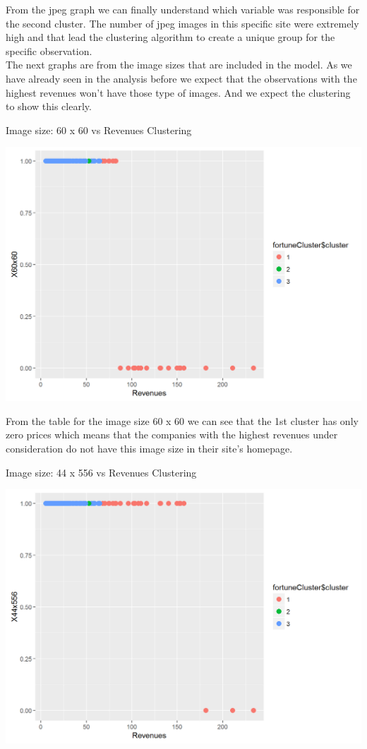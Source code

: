 \documentclass{book}
\begin{document}
From the jpeg graph we can finally understand which variable was responsible for the second cluster. The number of jpeg images in this specific site were extremely high and that lead the clustering algorithm to create a unique group for the specific observation.\\
The next graphs are from the image sizes that are included in the model. As we have already seen in the analysis before we expect that the observations with the highest revenues won't have those type of images. And we expect the clustering to show this clearly.
\begin{table}[H]
\centering
\caption{Image size: 60 x 60 vs Revenues Clustering}
\begin{center}
\includegraphics[scale=0.4]{../R/photos/96_clust_60.png}   \\
\end{center}
\end{table}
From the table for the image size 60 x 60 we can see that the 1st cluster has only zero prices which means that the companies with the highest revenues under consideration do not have this image size in their site's homepage.
\begin{table}[H]
\centering
\caption{Image size: 44 x 556 vs Revenues Clustering}
\begin{center}
\includegraphics[scale=0.4]{../R/photos/97_clust_44.png}   \\
\end{center}
\end{table}
\end{document}
